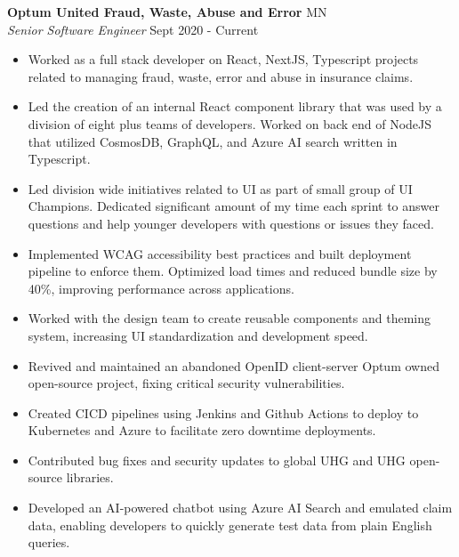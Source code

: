 \documentclass[a4paper]{article}
\begin{document}
\textbf{Optum United Fraud, Waste, Abuse and Error} \hfill MN\\
\textit{Senior Software Engineer} \hfill Sept 2020 - Current\\
\vspace{-1mm}
\begin{itemize} \itemsep 1pt
    \item Worked as a full stack developer on React, NextJS, Typescript projects related to managing fraud, waste, error and abuse in insurance claims.
    \item Led the creation of an internal React component library that was used by a division of eight plus teams of developers. Worked on back end of NodeJS that utilized CosmosDB, GraphQL, and Azure AI search written in Typescript. 
        \item Led division wide initiatives related to UI as part of small group of UI Champions. Dedicated significant amount of my time each sprint to answer questions and help younger developers with questions or issues they faced.
        \item Implemented WCAG accessibility best practices and built deployment pipeline to enforce them. Optimized load times and reduced bundle size by 40\%, improving performance across applications.
        \item Worked with the design team to create reusable components and theming system, increasing UI standardization and development speed.
    \item Revived and maintained an abandoned OpenID client-server Optum owned open-source project, fixing critical security vulnerabilities.
    \item Created CICD pipelines using Jenkins and Github Actions to deploy to Kubernetes and Azure to facilitate zero downtime deployments.
        \item Contributed bug fixes and security updates to global UHG and UHG open-source libraries.
        \item Developed an AI-powered chatbot using Azure AI Search and emulated claim data, enabling developers to quickly generate test data from plain English queries.    

\end{itemize}
\end{document}
